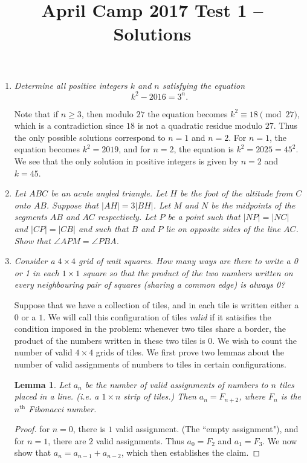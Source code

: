 \documentclass[a4paper,12pt, titlepage]{article}
\title{April Camp 2017 Test 1 -- Solutions}
\date{}
\newtheorem{lemma}{Lemma}
\begin{document}
 \maketitle

\begin{enumerate}
	\item 
	\textit{Determine all positive integers $k$ and $n$ satisfying the equation $$k^2 - 2016 = 3^n.$$}
	
    Note that if $n \geq 3$, then modulo $27$ the equation becomes $k^2 \equiv
    18 \pmod{27}$, which is a contradiction since $18$ is not a quadratic residue
    modulo $27$. Thus the only possible solutions correspond to $n=1$ and
    $n=2$. For $n=1$, the equation becomes $k^2 = 2019$, and for $n=2$, the
    equation is $k^2 = 2025 = 45^2$. We see that the only solution in
    positive integers is given by $n=2$ and $k=45$.
		
	\item 
	\textit{Let $ABC$ be an acute angled triangle. Let $H$ be the foot of the altitude from $C$ onto $AB$. Suppose that $|AH|=3|BH|$. Let $M$ and $N$ be the midpoints of the segments $AB$ and $AC$ respectively. Let $P$ be a point such that $|NP|=|NC|$ and $|CP|=|CB|$ and such that $B$ and $P$ lie on opposite sides of the line $AC$. Show that $\angle APM = \angle PBA$.}
	
	
	
	\item
	\textit{Consider a $4 \times 4$ grid of unit squares. How many ways are there to write a 0 or 1 in each $1 \times 1$ square so that the product of the two numbers written on every neighbouring pair of squares (sharing a common edge) is always 0?}
	
    Suppose that we have a collection of tiles, and in each tile is written
    either a $0$ or a $1$. We will call this configuration of tiles
    \emph{valid} if it satisifies the condition imposed in the problem:
    whenever two tiles share a border, the product of the numbers written
    in these two tiles is $0$. We wish to count the number of valid $4 \times
    4$ grids of tiles. We first prove two lemmas about the number of valid
    assignments of numbers to tiles in certain configurations.

    \begin{lemma} \label{lemma:strip}
        Let $a_n$ be the number of valid assignments of numbers to $n$ tiles
        placed in a line. (i.e. a $1 \times n$ strip of tiles.) Then $a_n =
        F_{n+2}$, where $F_n$ is the $n^\text{th}$ Fibonacci number.
    \end{lemma}
    \begin{proof}
        for $n=0$, there is $1$ valid assignment. (The ``empty
        assignment"), and for $n=1$, there are $2$ valid assignments. Thus
        $a_0=F_2$ and $a_1=F_3$. We now show that $a_{n} = a_{n-1} + a_{n-2}$,
        which then establishes the claim.


\end{proof}
\end{enumerate}
\end{document}
